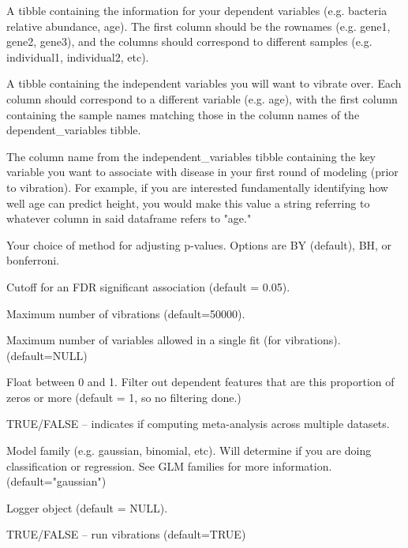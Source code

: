 \documentclass[a4paper]{book}
\begin{document}
%
\begin{Arguments}
\begin{ldescription}
\item[\code{dependent\_variables}] A tibble containing the information for your dependent variables (e.g. bacteria relative abundance, age). The first column should be the rownames (e.g. gene1, gene2, gene3), and the columns should correspond to different samples (e.g. individual1, individual2, etc).

\item[\code{independent\_variables}] A tibble containing the independent variables you will want to vibrate over. Each column should correspond to a different variable (e.g. age), with the first column containing the sample names matching those in the column names of the dependent\_variables tibble.

\item[\code{primary\_variable}] The column name from the independent\_variables tibble containing the key variable you want to associate with disease in your first round of modeling (prior to vibration). For example, if you are interested fundamentally identifying how well age can predict height, you would make this value a string referring to whatever column in said dataframe refers to "age."

\item[\code{fdr\_method}] Your choice of method for adjusting p-values. Options are BY (default), BH, or bonferroni.

\item[\code{fdr\_cutoff}] Cutoff for an FDR significant association (default = 0.05).

\item[\code{max\_vibration\_num}] Maximum number of vibrations (default=50000).

\item[\code{max\_vars\_in\_model}] Maximum number of variables allowed in a single fit (for vibrations). (default=NULL)

\item[\code{proportion\_cutoff}] Float between 0 and 1. Filter out dependent features that are this proportion of zeros or more (default = 1, so no filtering done.)

\item[\code{meta\_analysis}] TRUE/FALSE -- indicates if computing meta-analysis across multiple datasets.

\item[\code{model\_type}] Model family (e.g. gaussian, binomial, etc). Will determine if you are doing classification or regression. See GLM families for more information. (default="gaussian")

\item[\code{logger}] Logger object (default = NULL).

\item[\code{vibrate}] TRUE/FALSE -- run vibrations (default=TRUE)
\end{ldescription}
\end{Arguments}
\end{document}
